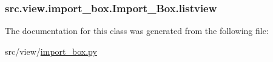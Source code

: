 \subsubsection[{listview}]{\setlength{\rightskip}{0pt plus 5cm}src.\+view.\+import\+\_\+box.\+Import\+\_\+\+Box.\+listview}\label{classsrc_1_1view_1_1import__box_1_1Import__Box_ad3fd38bc76c9b99490a2db8f23a8a931}


The documentation for this class was generated from the following file\+:\begin{DoxyCompactItemize}
\item 
src/view/\hyperlink{import__box_8py}{import\+\_\+box.\+py}\end{DoxyCompactItemize}
